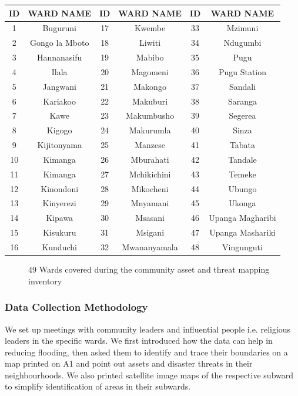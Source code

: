 \documentclass[a4paper,12pt,twoside]{article}
\begin{document}
\begin{center}
\begin{tabular}{|c|c|c|c|c|c|}
\hline
ID & WARD NAME & ID & WARD NAME & ID & WARD NAME\\
\hline
1 & Buguruni & 17 & Kwembe & 33 & Mzimuni\\
2 & Gongo la Mboto & 18 & Liwiti & 34 & Ndugumbi\\
3 & Hannanasifu & 19 & Mabibo & 35 & Pugu\\
4 & Ilala & 20  & Magomeni & 36 & Pugu Station\\
5 & Jangwani & 21 & Makongo & 37 & Sandali\\
6 & Kariakoo & 22 & Makuburi & 38 & Saranga\\
7 & Kawe & 23 & Makumbusho & 39 & Segerea\\
8 & Kigogo & 24 & Makurumla & 40 & Sinza\\
9 & Kijitonyama & 25 & Manzese & 41 & Tabata\\
10 & Kimanga & 26 & Mburahati & 42 & Tandale\\
11 & Kimanga & 27 & Mchikichini & 43 & Temeke\\
12 & Kinondoni & 28 & Mikocheni & 44 & Ubungo\\
13 & Kinyerezi & 29 & Mnyamani & 45 & Ukonga\\
14 & Kipawa & 30 & Msasani & 46 & Upanga Magharibi\\
15 & Kisukuru & 31 & Msigani & 47 & Upanga Mashariki\\
16 & Kunduchi & 32 & Mwananyamala & 48 & Vingunguti\\
 \hline
\end{tabular}
\end{center}
\begin{figure}[h]
  \color{RHgreen}\caption{49 Wards covered during the community asset and threat mapping inventory}
  \centering
\end{figure}
\subsubsection{Data Collection Methodology}
We set up meetings with community leaders and influential people i.e. religious leaders in the specific wards. We first introduced how the data can help in reducing flooding, then asked them to identify and trace their boundaries on a map printed on A1 and point out assets and disaster threats in their neighbourhoods. We also printed satellite image maps of the respective subward to simplify identification of areas in their subwards.
\end{document}
